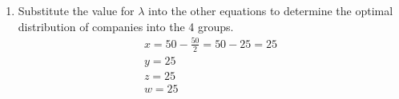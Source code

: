 \documentclass[letterpaper,12pt,fleqn]{article}
\renewcommand{\l}{\lambda}
\begin{document}
\begin{enumerate}[label={\alph*)}]
\item Substitute the value for \(\l\) into the other equations to determine the optimal distribution of companies
  into the 4 groups.
  \begin{gather*}
    x=50-\frac{50}{2}=50-25=25 \\
    y=25 \\
    z=25 \\
    w=25
  \end{gather*}
\end{enumerate}
\end{document}

